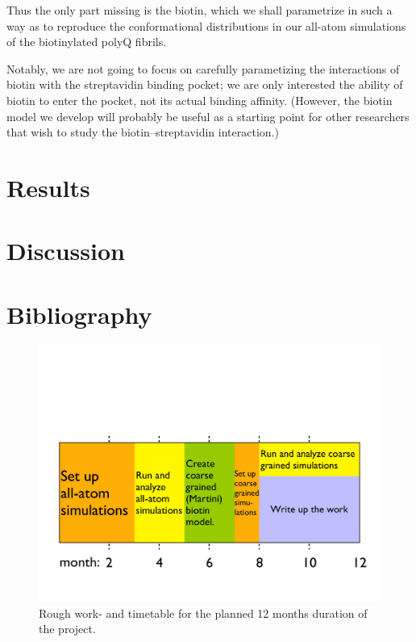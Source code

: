 \documentclass[a4paper,11pt,floatfix,authordate1-4,twocolumn]{revtex4-1}
\begin{document}
%
Thus the only part missing is the biotin, which we shall parametrize
in such a way as to reproduce the conformational distributions
in our all-atom simulations of the biotinylated polyQ fibrils.

Notably, we are not going to focus on carefully parametizing
the interactions of biotin with the streptavidin binding pocket;
we are only interested the ability of biotin to enter the pocket,
not its actual binding affinity.
%
(However, the biotin model we develop will probably be useful
as a starting point for other researchers that wish
to study the biotin--streptavidin interaction.)


\section{Results}


\section{Discussion}


\section*{Bibliography}







\begin{figure}[!hb]
\centering
\includegraphics[width=\columnwidth]{../Figs/timetable.pdf}
\captionsetup{labelformat=empty}
\caption{\label{Fig:timetable}\footnotesize
Rough work- and timetable for the planned 12 months
duration of the project.
}
\end{figure}

\end{document}
